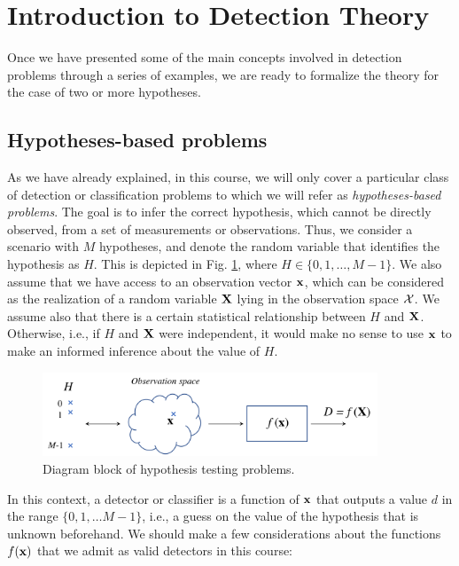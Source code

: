 \section{Introduction to Detection Theory}
\label{sec:SDT}

Once we have presented some of the main concepts involved in detection problems through a series of examples, we are ready to formalize the theory for the case of two or more hypotheses.

\subsection{Hypotheses-based problems}
\label{subsec:hypotheses_problems}

As we have already explained, in this course, we will only cover a particular class of detection or classification problems to which we will refer as {\em hypotheses-based problems}. The goal is to infer the correct hypothesis, which cannot be directly observed, from a set of measurements or observations.  Thus, we consider a scenario with $M$ hypotheses, and denote the random variable that identifies the hypothesis as $H$. This is depicted in Fig. \ref{fig:clas_overview}, where $H \in \{0, 1, \ldots, M-1\}$. We also assume that we have access to an observation vector $\bf x$, which can be considered as the realization of a random variable $\bf X$ lying in the observation space $\cal X$. We assume also that there is a certain statistical relationship between $H$ and $\bf X$. Otherwise, i.e., if $H$ and $\bf X$ were independent, it would make no sense to use $\bf x$ to make an informed inference about the value of $H$.

    \begin{figure}
        \begin{center}
            \includegraphics[width=10cm]{Figures//classification_overview.png}
        \end{center}
        \caption{Diagram block of hypothesis testing problems.\label{fig:clas_overview}}
    \end{figure}

In this context, a detector or classifier is a function of $\bf x$ that outputs a value $d$ in the range $\{0, 1, \ldots M-1\}$, i.e., a guess on the value of the hypothesis that is unknown beforehand. We should make a few considerations about the functions $f({\bf x})$ that we admit as valid detectors in this course:

